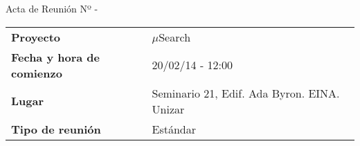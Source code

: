 \begin{center}	
\Large{Acta de Reunión Nº \numeroDeReunion\hspace{0.25em}-\hspace{0.25em}\tituloReunion}
\end{center}
\vspace{1.5em}

\begin{longtable}{ | L{\tabcolsep} |
				     L{\tabcolsep} | }
\hline %
  \\
\hline %
{\bf Proyecto} & $\mu$Search \\ 
\hline %
{\bf Fecha y hora de comienzo} & 20/02/14 - 12:00 \\
\hline %
{\bf Lugar} & Seminario 21, Edif. Ada Byron. EINA. Unizar \\
\hline %
{\bf Tipo de reunión} & Estándar \\
\hline %
\end{longtable}


